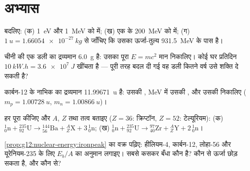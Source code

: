 \section{अभ्यास}

\begin{exercise}[$\star$]\label{exo:g12:nuclear-energy:1}
बदलिए: (क) \qty{1}{eV} और \qty{1}{MeV} को  में; (ख) एक  के
\qty{200}{MeV} को  में; (ग) $\qty{1}{u} = \qty{1.66054e-27}{kg}$ से जाँचिए कि उसका ऊर्जा-तुल्य
\qty{931.5}{MeV} के पास है।
\end{exercise}

\begin{exercise}[$\star$]\label{exo:g12:nuclear-energy:2}
चीनी की एक डली का द्रव्यमान \qty{6.0}{g} है: उसका पूरा $E = mc^2$ मान निकालिए। कोई घर
प्रतिदिन $\qty{10}{kW.h} = \qty{3.6e7}{J}$ खींचता है --- पूरी तरह बदल दी गई वह डली कितने वर्ष उसे
शक्ति दे सकती है?
\end{exercise}

\begin{exercise}[$\star$]\label{exo:g12:nuclear-energy:3}
कार्बन-12 के नाभिक का द्रव्यमान \qty{11.99671}{u} है: उसकी , \unit{MeV} में उसकी , और उसकी  निकालिए ($m_p = \qty{1.00728}{u}$, $m_n = \qty{1.00866}{u}$)।
\end{exercise}

\begin{exercise}[$\star$]\label{exo:g12:nuclear-energy:4}
हर  पूरा कीजिए और $A$, $Z$ तथा तत्व बताइए ($Z = 36$:
क्रिप्टॉन, $Z = 52$: टेल्यूरियम):
(क) ${}^{1}_{0}\mathrm{n} + {}^{235}_{92}\mathrm{U} \to
{}^{144}_{56}\mathrm{Ba} + {}^{A}_{Z}\mathrm{X} + 3\,{}^{1}_{0}\mathrm{n}$;
(ख) ${}^{1}_{0}\mathrm{n} + {}^{235}_{92}\mathrm{U} \to
{}^{97}_{40}\mathrm{Zr} + {}^{A}_{Z}\mathrm{Y} + 2\,{}^{1}_{0}\mathrm{n}$।
\end{exercise}

\begin{exercise}[$\star$]\label{exo:g12:nuclear-energy:5}
\cref{prop:g12:nuclear-energy:ironpeak} का वक्र पढ़िए: हीलियम-4, कार्बन-12, लोहा-56 और यूरेनियम-235 के लिए
$E_b/A$ का अनुमान लगाइए। सबसे कसकर बँधा कौन है? कौन  से
ऊर्जा छोड़ सकता है, और कौन  से?
\end{exercise}

